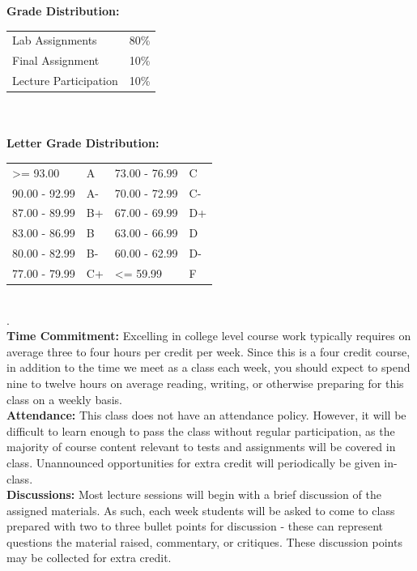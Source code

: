 \documentclass[11pt]{article}
\begin{document}
\textbf {\large Grade Distribution:} \\
\hspace*{40mm}
\begin{tabular}{ l l }
Lab Assignments & 80\% \\
Final Assignment & 10\% \\
Lecture Participation  & 10\% \\
\end{tabular} \\\\

\textbf {\large Letter Grade Distribution:} \\
\hspace*{40mm}
\begin{tabular}{ l l | l l }
\textgreater= 93.00 & A & 73.00 - 76.99 & C \\
90.00 - 92.99 & A-  & 70.00 - 72.99 & C- \\
87.00 - 89.99 & B+  & 67.00 - 69.99 & D+ \\
83.00 - 86.99 & B  & 63.00 - 66.99 & D \\
80.00 - 82.99 & B-  & 60.00 - 62.99 & D- \\
77.00 - 79.99 & C+  & \textless= 59.99 & F \\
\end{tabular} \\
.\\
\textbf {\large Time Commitment:} Excelling in college level course work typically requires on average three to four hours per credit per week.  Since this is a four credit course, in addition to the time we meet as a class each week, you should expect to spend nine to twelve hours on average reading, writing, or otherwise preparing for this class on a weekly basis.\\

\textbf {\large Attendance:} This class does not have an attendance policy.  However, it will be difficult to learn enough to pass the class without regular participation, as the majority of course content relevant to tests and assignments will be covered in class.  Unannounced opportunities for extra credit will periodically be given in-class.\\

\textbf {\large Discussions:} Most lecture sessions will begin with a brief discussion of the assigned materials.  As such, each week students will be asked to come to class prepared with two to three bullet points for discussion - these can represent questions the material raised, commentary, or critiques.  These discussion points may be collected for extra credit.\\
\end{document}
